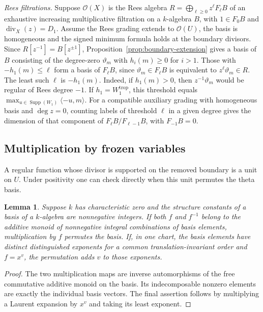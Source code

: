 \documentclass[11pt,reqno]{amsart}
\numberwithin{equation}{section}
\newtheorem{lemma}[theorem]{Lemma}
\theoremstyle{definition}
\theoremstyle{remark}
\DeclareMathOperator{\Supp}{Supp}
\begin{document}
\emph{Rees filtrations.} Suppose \(\mathcal O(X)\) is the Rees algebra
\(R=\bigoplus_{\ell\ge0}z^\ell F_\ell B\) of an exhaustive increasing
multiplicative filtration on a \(k\)-algebra \(B\), with \(1\in F_0B\)
and \(\operatorname{div}_X(z)=D_1\). Assume the Rees grading extends
to \(\mathcal O(U)\), the basis is homogeneous and the signed minimum
formula holds at the boundary divisors. Since \(R[z^{-1}]=B[z^{\pm1}]\),
Proposition~\ref{prop:boundary-extension} gives a basis of \(B\)
consisting of the degree-zero \(\vartheta_m\) with \(h_i(m)\ge0\) for
\(i>1\). Those with \(-h_1(m)\le\ell\) form a basis of \(F_\ell B\), since
\(\vartheta_m\in F_\ell B\) is equivalent to \(z^\ell\vartheta_m\in R\). The least such
\(\ell\) is \(-h_1(m)\). Indeed, if \(h_1(m)>0\), then
\(z^{-1}\vartheta_m\) would be regular of Rees degree \(-1\).
If \(h_1=W_1^{\mathrm{trop}}\), this threshold equals
\(\max_{u\in\Supp(W_1)}\langle-u,m\rangle\). For a compatible auxiliary
grading with homogeneous basis and \(\deg z=0\), counting labels of
threshold \(\ell\) in a given degree gives the dimension of that
component of \(F_\ell B/F_{\ell-1}B\), with \(F_{-1}B=0\).

\subsection{Multiplication by frozen variables}

A regular function whose divisor is supported on the removed boundary
is a unit on \(U\). Under positivity one can check directly when this
unit permutes the theta basis.

\begin{lemma}\label{lem:positive-boundary-unit}
Suppose \(k\) has characteristic zero and the structure constants of a
basis of a \(k\)-algebra are nonnegative integers. If both \(f\)
and \(f^{-1}\) belong to the additive monoid of nonnegative integral
combinations of basis elements, multiplication by \(f\) permutes the
basis. If, in one chart, the basis elements have distinct distinguished
exponents for a common translation-invariant order and \(f=x^v\),
the permutation adds \(v\) to those exponents.
\end{lemma}

\begin{proof}
The two multiplication maps are inverse automorphisms of the free
commutative additive monoid on the basis. Its indecomposable nonzero
elements are exactly the individual basis vectors. The final assertion
follows by multiplying a Laurent expansion by \(x^v\) and taking its
least exponent.
\end{proof}
\end{document}

